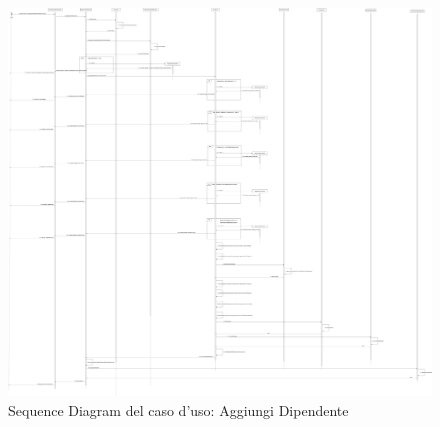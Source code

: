 \begin{figure}[H]
	\centering
	\includegraphics[width=\textwidth,height=\textheight,keepaspectratio]{Immagini/Sequence diagram/Sequence Diagram Aggiungi Dipendente.png}
	\caption[Sequence diagram 4]{Sequence Diagram del caso d'uso: Aggiungi Dipendente}
\end{figure}

